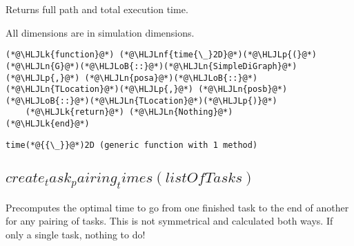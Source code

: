 \documentclass[12pt,a4paper]{article}
\newcommand{\HLJLk}[1]{\textcolor[RGB]{148,91,176}{\textbf{#1}}}
\newcommand{\HLJLn}[1]{#1}
\newcommand{\HLJLnf}[1]{\textcolor[RGB]{66,102,213}{#1}}
\newcommand{\HLJLoB}[1]{\textcolor[RGB]{102,102,102}{\textbf{#1}}}
\newcommand{\HLJLp}[1]{#1}
\begin{document}
Returns full path and total execution time.

All dimensions are in simulation dimensions.


\begin{lstlisting}
(*@\HLJLk{function}@*) (*@\HLJLnf{time{\_}2D}@*)(*@\HLJLp{(}@*)(*@\HLJLn{G}@*)(*@\HLJLoB{::}@*)(*@\HLJLn{SimpleDiGraph}@*)(*@\HLJLp{,}@*) (*@\HLJLn{posa}@*)(*@\HLJLoB{::}@*)(*@\HLJLn{TLocation}@*)(*@\HLJLp{,}@*) (*@\HLJLn{posb}@*)(*@\HLJLoB{::}@*)(*@\HLJLn{TLocation}@*)(*@\HLJLp{)}@*)
    (*@\HLJLk{return}@*) (*@\HLJLn{Nothing}@*)
(*@\HLJLk{end}@*)
\end{lstlisting}

\begin{lstlisting}
time(*@{{\_}}@*)2D (generic function with 1 method)
\end{lstlisting}


\subsection{$create_task_pairing_times(listOfTasks)$}
Precomputes the optimal time to go from one finished task to the end of another for any pairing of tasks. This is not symmetrical and calculated both ways.  If only a single task, nothing to do!
\end{document}
